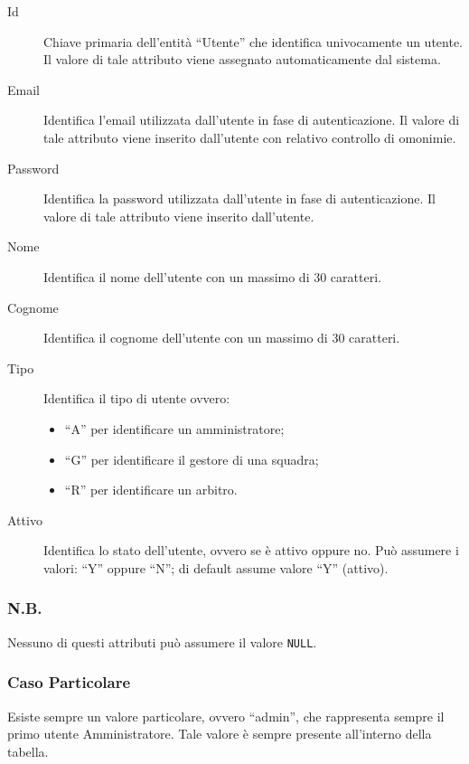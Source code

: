		\begin{description}
			
			\item[Id]
			Chiave primaria dell'entità ``Utente'' che identifica univocamente un utente. Il valore di tale attributo viene assegnato automaticamente dal sistema.
			
			\item[Email]
			Identifica l'email utilizzata dall'utente in fase di autenticazione. Il valore di tale attributo viene inserito dall'utente con relativo controllo di omonimie.
			
			\item[Password]
			Identifica la password utilizzata dall'utente in fase di autenticazione. Il valore di tale attributo viene inserito dall'utente.
			
			\item[Nome]
			Identifica il nome dell'utente con un massimo di 30 caratteri.
			
			\item[Cognome]
			Identifica il cognome dell'utente con un massimo di 30 caratteri.
			
			\item[Tipo]
			Identifica il tipo di utente ovvero:
			\begin{itemize}
				\item
				``A'' per identificare un amministratore;
				\item
				``G'' per identificare il gestore di una squadra;
				\item
				``R'' per identificare un arbitro.
			\end{itemize}
			
			\item[Attivo]
			Identifica lo stato dell'utente, ovvero se è attivo oppure no. Può assumere i valori: ``Y'' oppure ``N''; di default assume valore ``Y'' (attivo).
			
		\end{description}
		
		\subsubsection*{N.B.}
		Nessuno di questi attributi può assumere il valore \texttt{NULL}.
		
		\subsubsection*{Caso Particolare}
		Esiste sempre un valore particolare, ovvero ``admin'', che rappresenta sempre il primo utente Amministratore. Tale valore è sempre presente all'interno della tabella.
	
